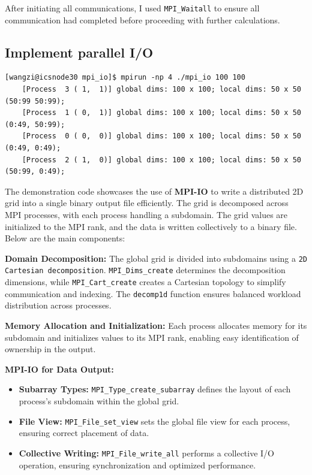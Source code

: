 \documentclass[unicode,11pt,a4paper,oneside,numbers=endperiod,openany]{scrartcl}
\begin{document}
After initiating all communications, I used \texttt{MPI\_Waitall} to ensure all communication had completed before proceeding with further calculations.
\subsection{Implement parallel I\//O}
\begin{lstlisting}[style=mystyle, language=MyBash, caption={Output of MPI Program for Distributed IO}]
    [wangzi@icsnode30 mpi_io]$ mpirun -np 4 ./mpi_io 100 100
    [Process  3 ( 1,  1)] global dims: 100 x 100; local dims: 50 x 50 (50:99 50:99);
    [Process  1 ( 0,  1)] global dims: 100 x 100; local dims: 50 x 50 (0:49, 50:99);
    [Process  0 ( 0,  0)] global dims: 100 x 100; local dims: 50 x 50 (0:49, 0:49);
    [Process  2 ( 1,  0)] global dims: 100 x 100; local dims: 50 x 50 (50:99, 0:49);
\end{lstlisting}
    
The demonstration code showcases the use of \textbf{MPI-IO} to write a distributed 2D grid into a single binary output file efficiently. The grid is decomposed across MPI processes, with each process handling a subdomain. The grid values are initialized to the MPI rank, and the data is written collectively to a binary file. Below are the main components:

\textbf{Domain Decomposition:} The global grid is divided into subdomains using a \texttt{2D Cartesian decomposition}. \texttt{MPI\_Dims\_create} determines the decomposition dimensions, while \texttt{MPI\_Cart\_create} creates a Cartesian topology to simplify communication and indexing. The \texttt{decomp1d} function ensures balanced workload distribution across processes.

\textbf{Memory Allocation and Initialization:} Each process allocates memory for its subdomain and initializes values to its MPI rank, enabling easy identification of ownership in the output.

\textbf{MPI-IO for Data Output:} 
\begin{itemize}
    \item \textbf{Subarray Types:} \texttt{MPI\_Type\_create\_subarray} defines the layout of each process’s subdomain within the global grid.
    \item \textbf{File View:} \texttt{MPI\_File\_set\_view} sets the global file view for each process, ensuring correct placement of data.
    \item \textbf{Collective Writing:} \texttt{MPI\_File\_write\_all} performs a collective I/O operation, ensuring synchronization and optimized performance.
\end{itemize}
\end{document}
